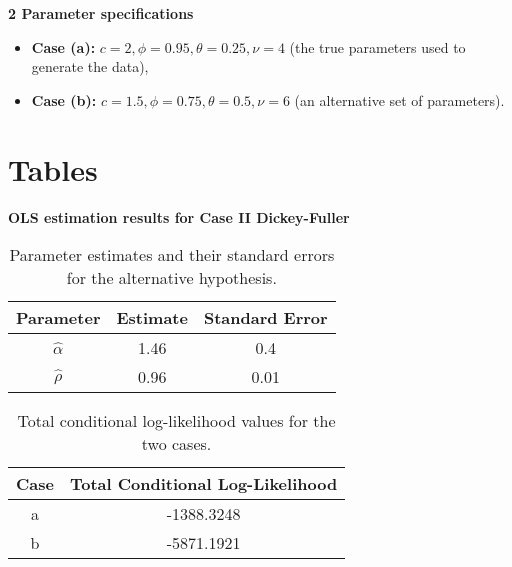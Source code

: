 \documentclass[12pt]{article}
\begin{document}
\textbf{2 Parameter specifications}
\begin{itemize}
    \item \textbf{Case (a):} $c = 2, \phi = 0.95, \theta = 0.25, \nu = 4$ (the true parameters used to generate the data),
    \item \textbf{Case (b):} $c = 1.5, \phi = 0.75, \theta = 0.5, \nu = 6$ (an alternative set of parameters).
    \label{specifica}
\end{itemize}




\newpage
\section{Tables}
\textbf{OLS estimation results for Case II Dickey-Fuller}
\begin{table}[h!]
\centering
\begin{tabular}{|c|c|c|}
\hline
\textbf{Parameter} & \textbf{Estimate} & \textbf{Standard Error} \\ \hline
$\hat{\alpha}$     & 1.46              & 0.4                     \\ \hline
$\hat{\rho}$       & 0.96              & 0.01                    \\ \hline
\end{tabular}
\caption{Parameter estimates and their standard errors for the alternative hypothesis.}
\label{tab:parameter_estimates}
\end{table}

\begin{table}[h!]
\centering
\begin{tabular}{|c|c|}
\hline
\textbf{Case} & \textbf{Total Conditional Log-Likelihood} \\ \hline
a             & -1388.3248                                \\ \hline
b             & -5871.1921                                \\ \hline
\end{tabular}
\caption{Total conditional log-likelihood values for the two cases.}
\label{tab:log_likelihood_results}
\end{table}
\end{document}
